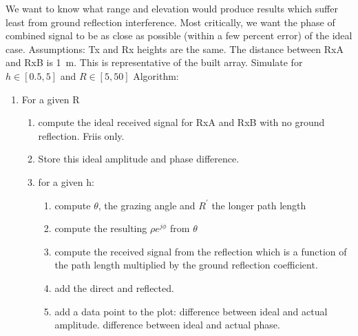 We want to know what range and elevation would produce results which suffer least from ground reflection interference. Most critically, we want the phase of combined signal to be as close as possible (within a few percent error) of the ideal case. 
Assumptions: Tx and Rx heights are the same. The distance between RxA and RxB is \SI{1}{\meter}. This is representative of the built array. Simulate for \(h \in \left[ 0.5 , 5 \right]\) and \(R \in \left[5, 50\right]\)
Algorithm:
\begin{enumerate}
  \item For a given R
    \begin{enumerate}
      \item compute the ideal received signal for RxA and RxB with no ground reflection. Friis only.
      \item Store this ideal amplitude and phase difference.
      \item for a given h:
        \begin{enumerate}
          \item compute \(\theta\), the grazing angle and \(R^\prime\) the longer path length
          \item compute the resulting \(\rho e^{j\phi}\) from \(\theta\)
          \item compute the received signal from the reflection which is a function of the path length multiplied by the ground reflection coefficient. 
          \item add the direct and reflected.
          \item add a data point to the plot: difference between ideal and actual amplitude. difference between ideal and actual phase.
        \end{enumerate}
    \end{enumerate}
\end{enumerate}

